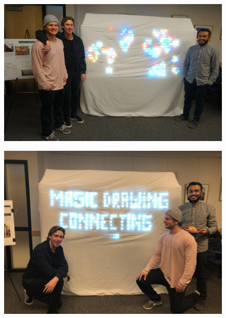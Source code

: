 \documentclass[11pt]{IEEEtran}
\begin{document}
\begin{figure}[tb]
  \centering
  \includegraphics[width=15cm]{team1.jpg}
\end{figure}

\begin{figure}[tb]
  \centering
  \includegraphics[width=15cm]{team2.jpg}
\end{figure}
\end{document}
